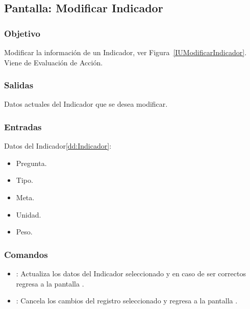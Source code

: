 \subsection{Pantalla: Modificar Indicador}

\subsubsection{Objetivo}
Modificar la información de un Indicador, ver Figura~\ref{IUModificarIndicador}. Viene de Evaluación de Acción.


\subsubsection{Salidas}
Datos actuales del Indicador que se desea modificar.

\subsubsection{Entradas}
 Datos del Indicador\ref{dd:Indicador}:
 \begin{itemize}
  \item Pregunta.
  \item Tipo.
  \item Meta.
  \item Unidad.
  \item Peso.
 \end{itemize}

\subsubsection{Comandos}
\begin{itemize}
 	\item {}: Actualiza los datos del Indicador seleccionado y en caso de ser correctos regresa a la pantalla .
 	\item {}: Cancela los cambios del registro seleccionado y regresa a la pantalla .
\end{itemize}